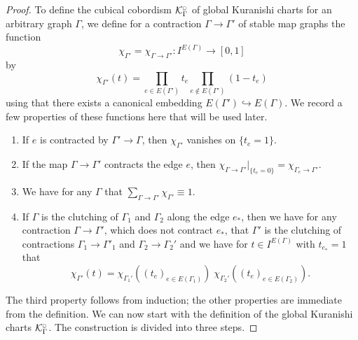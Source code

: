\documentclass[11pt,psamsfonts, oneside, reqno]{amsart}
\newcommand{\hkra}{\hookrightarrow}
\newcommand{\s}[2]{\sum\limits_{#1}{#2} }
\newcommand{\cl}{\colon}
\newcommand{\cK}{\mathcal{K}}
\newcommand{\cKc}{\cK^{\scale{\square}{0.6}}}
\newcommand{\scale}[2]{\scaleobj{#2}{#1}}
\theoremstyle{definition}
\theoremstyle{remark}
\numberwithin{equation}{section}
\begin{document}
\begin{proof}
	To define the cubical cobordism $\cKc_\Gamma$ of global Kuranishi charts for an arbitrary graph $\Gamma$, we define for a contraction $\Gamma\to \Gamma'$ of stable map graphs the function 
	\begin{equation}\label{} \chi_{\Gamma'} = \chi_{\Gamma\to \Gamma'}\cl I^{E(\Gamma)} \rightarrow [0,1]\end{equation} 
	by 
	\begin{equation}\label{eq:interpolating-perturbations} \chi_{\Gamma'}(t) = \prod_{e\in E(\Gamma')} t_e \prod_{e\notin E(\Gamma')} (1-t_e)\end{equation}
	using that there exists a canonical embedding $E(\Gamma')\hkra E(\Gamma)$. 
	We record a few properties of these functions here that will be used later.
	\begin{enumerate}[label=($\chi$\arabic*),leftmargin= 30pt,ref=$\chi$\arabic*]
		\item\label{vanishing} If $e$ is contracted by $\Gamma'\to \Gamma$, then $\chi_{\Gamma'}$ vanishes on $\{t_e = 1\}$.
		\smallskip
		\item\label{restricting} If the map $\Gamma\to \Gamma'$ contracts the edge $e$, then $\chi_{\Gamma\to\Gamma'}|_{\{t_e = 0\}} = \chi_{\Gamma_e\to\Gamma'}$.
		\smallskip
		\item\label{summing} We have for any $\Gamma$ that $\s{\Gamma\to \Gamma'}{\chi_{\Gamma'}}\equiv 1$.
		\item\label{clutching} If $\Gamma$ is the clutching of $\Gamma_1$ and $\Gamma_2$ along the edge $e_*$, then we have for any contraction $\Gamma\to \Gamma'$, which does not contract $e_*$, that $\Gamma'$ is the clutching of contractions $\Gamma_1\to \Gamma'_1$ and $\Gamma_2\to \Gamma_2'$ and  we have for $t\in I^{E(\Gamma)}$ with $t_{e_*} = 1$ that 
		$$\chi_{\Gamma'}(t) = \chi_{\Gamma_1'}((t_e)_{e\in E(\Gamma_1)})\;\chi_{\Gamma_2'}((t_e)_{e\in E(\Gamma_2)}).$$
	\end{enumerate}
	The third property follows from induction; the other properties are immediate from the definition. We can now start with the definition of the global Kuranishi charts $\cKc_\Gamma$. The construction is divided into three steps.\par
	
	
	

\end{proof}
\end{document}
